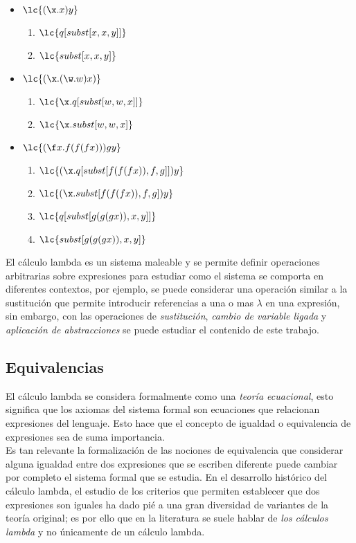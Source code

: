 \begin{itemize}
\item \(\lc{(\x.x)y}\)
  \begin{enumerate}
  \item \(\lc{q[subst[x,x,y]]}\)
  \item \(\lc{subst[x,x,y]}\)
  \end{enumerate}
\item \(\lc{(\x.(\w.w)x)}\)
  \begin{enumerate}
  \item \(\lc{\x.q[subst[w,w,x]]}\)
  \item \(\lc{\x.subst[w,w,x]}\)
  \end{enumerate}
\item \(\lc{(\f x.f(f(f x)))g y}\)
  \begin{enumerate}
  \item \(\lc{(\x.q[subst[f(f(f x)), f, g]]) y}\)
  \item \(\lc{(\x.subst[f(f(f x)), f, g]) y}\)
  \item \(\lc{q[subst[g(g(g x)), x, y]]}\)
  \item \(\lc{subst[g(g(g x)), x, y]}\)
  \end{enumerate}
\end{itemize}

El cálculo lambda es un sistema maleable y se permite definir operaciones
arbitrarias sobre expresiones para estudiar como el sistema se comporta en
diferentes contextos, por ejemplo, se puede considerar una operación similar a
la sustitución que permite introducir referencias a una o mas \(\lambda\) en una
expresión, sin embargo, con las operaciones de \emph{sustitución}, \emph{cambio de
  variable ligada} y \emph{aplicación de abstracciones} se puede estudiar el
contenido de este trabajo. \\

\subsection{Equivalencias}

El cálculo lambda se considera formalmente como una \emph{teoría ecuacional},
esto significa que los axiomas del sistema formal son ecuaciones que relacionan
expresiones del lenguaje. Esto hace que el concepto de igualdad o equivalencia
de expresiones sea de suma importancia. \\

Es tan relevante la formalización de las nociones de equivalencia que considerar
alguna igualdad entre dos expresiones que se escriben diferente puede cambiar
por completo el sistema formal que se estudia. En el desarrollo histórico del
cálculo lambda, el estudio de los criterios que permiten establecer que dos
expresiones son iguales ha dado pié a una gran diversidad de variantes de la
teoría original; es por ello que en la literatura se suele hablar de \emph{los
cálculos lambda} y no únicamente de un cálculo lambda. \\

